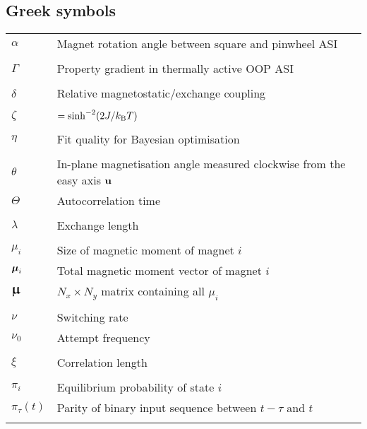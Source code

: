 \subsection*{Greek symbols}
\begin{longtable}[l]{p{60pt} p{350pt}}
	$\alpha$ & Magnet rotation angle between square and pinwheel ASI \\
	&\\
	
	$\Gamma$ & Property gradient in thermally active OOP ASI \\
	&\\

	$\delta$ & Relative magnetostatic/exchange coupling \\
	&\\
	
	$\zeta$ & $=\sinh^{-2}(2J/\kBT)$ \\
	&\\
	
	$\eta$ & Fit quality for Bayesian optimisation \\
	&\\

	$\theta$ & In-plane magnetisation angle measured clockwise from the easy axis $\boldsymbol{\mathbf{u}}$ \\
	$\Theta$ & Autocorrelation time \\
	&\\
	
	$\lambda$ & Exchange length \\
	&\\

	$\mu_i$ & Size of magnetic moment of magnet $i$ \\
	$\boldsymbol{\mathbf{\mu}}_i$ & Total magnetic moment vector of magnet $i$ \\
	$\vc{\bigmu}$ & $N_x \times N_y$ matrix containing all $\mu_i$ \\
	&\\
	
	$\nu$ & Switching rate \\
	$\nu_0$ & Attempt frequency \\
	&\\
	
	$\xi$ & Correlation length \\
	&\\

	$\pi_i$ & Equilibrium probability of state $i$ \\
	$\pi_\tau(t)$ & Parity of binary input sequence between $t-\tau$ and $t$ \\
	&\\


\end{longtable}
